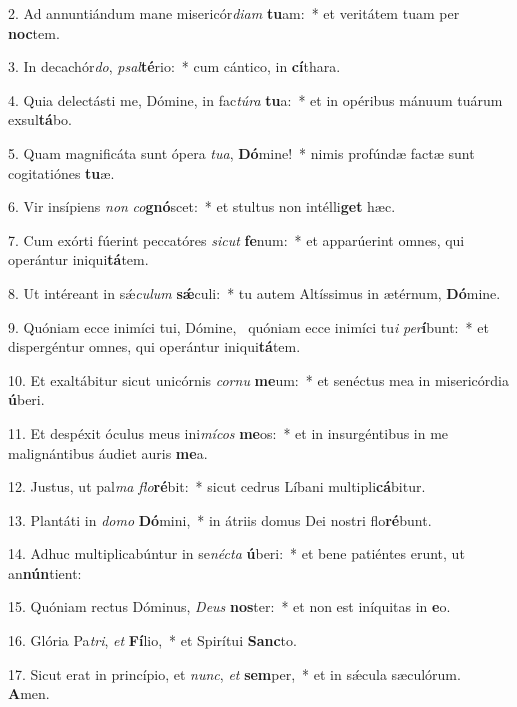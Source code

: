 2. Ad annuntiándum mane misericór\textit{di}\textit{am} \textbf{tu}am:~*  et veritátem tuam per \textbf{noc}tem.\

3. In decachór\textit{do}, \textit{psal}\textbf{té}rio:~*  cum cántico, in \textbf{cí}thara.\

4. Quia delectásti me, Dómine, in fac\textit{tú}\textit{ra} \textbf{tu}a:~*  et in opéribus mánuum tuárum exsul\textbf{tá}bo.\

5. Quam magnificáta sunt ópera \textit{tu}\textit{a}, \textbf{Dó}mine!~*  nimis profúndæ factæ sunt cogitatiónes \textbf{tu}æ.\

6. Vir insípiens \textit{non} \textit{co}\textbf{gnó}scet:~*  et stultus non intélli\textbf{get} hæc.\

7. Cum exórti fúerint peccatóres \textit{sic}\textit{ut} \textbf{fe}num:~*  et apparúerint omnes, qui operántur iniqui\textbf{tá}tem.\

8. Ut intéreant in sǽ\textit{cu}\textit{lum} \textbf{sǽ}culi:~*  tu autem Altíssimus in ætérnum, \textbf{Dó}mine.\

9. Quóniam ecce inimíci tui, Dómine, \dag\  quóniam ecce inimíci tu\textit{i} \textit{per}\textbf{í}bunt:~*  et dispergéntur omnes, qui operántur iniqui\textbf{tá}tem.\

10. Et exaltábitur sicut unicórnis \textit{cor}\textit{nu} \textbf{me}um:~*  et senéctus mea in misericórdia \textbf{ú}beri.\

11. Et despéxit óculus meus ini\textit{mí}\textit{cos} \textbf{me}os:~*  et in insurgéntibus in me malignántibus áudiet auris \textbf{me}a.\

12. Justus, ut pal\textit{ma} \textit{flo}\textbf{ré}bit:~*  sicut cedrus Líbani multipli\textbf{cá}bitur.\

13. Plantáti in \textit{do}\textit{mo} \textbf{Dó}mini,~*  in átriis domus Dei nostri flo\textbf{ré}bunt.\

14. Adhuc multiplicabúntur in se\textit{néc}\textit{ta} \textbf{ú}beri:~*  et bene patiéntes erunt, ut an\textbf{nún}tient:\

15. Quóniam rectus Dóminus, \textit{De}\textit{us} \textbf{nos}ter:~*  et non est iníquitas in \textbf{e}o.\

16. Glória Pa\textit{tri}, \textit{et} \textbf{Fí}lio,~*  et Spirítui \textbf{Sanc}to.\

17. Sicut erat in princípio, et \textit{nunc}, \textit{et} \textbf{sem}per,~*  et in sǽcula sæculórum. \textbf{A}men.\

